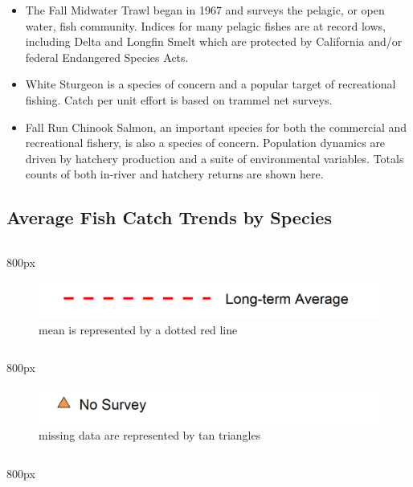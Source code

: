 \documentclass[
]{book}
\providecommand{\tightlist}{%
  \setlength{\itemsep}{0pt}\setlength{\parskip}{0pt}}
\begin{document}
\begin{itemize}
\tightlist
\item
  The Fall Midwater Trawl began in 1967 and surveys the pelagic, or open water, fish community. Indices for many pelagic fishes are at record lows, including Delta and Longfin Smelt which are protected by California and/or federal Endangered Species Acts.
\item
  White Sturgeon is a species of concern and a popular target of recreational fishing. Catch per unit
  effort is based on trammel net surveys.
\item
  Fall Run Chinook Salmon, an important species for both the commercial and recreational fishery, is also a species of concern. Population dynamics are driven by hatchery production and a suite of environmental variables. Totals counts of both in-river and hatchery returns are shown here.
\end{itemize}

\hypertarget{average-fish-catch-trends-by-species-3}{%
\subsection{Average Fish Catch Trends by Species}\label{average-fish-catch-trends-by-species-3}}

\begin{column}{800px\textwidth}
\begin{figure}
\includegraphics[width=15.25in]{figures/mline} \caption{mean is represented by a dotted red line}\label{fig:unnamed-chunk-119}
\end{figure}
\end{column}

\begin{column}{800px\textwidth}
\begin{figure}
\includegraphics[width=15.25in]{figures/mpoint} \caption{missing data are represented by tan triangles}\label{fig:unnamed-chunk-120}
\end{figure}
\end{column}

\begin{column}{800px\textwidth}
\end{column}
\end{document}
